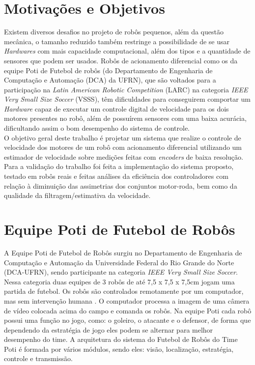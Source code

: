 \section{Motivações e Objetivos}
Existem diversos desafios no projeto de robôs pequenos, além da questão mecânica, o tamanho reduzido também restringe a possibilidade de se usar \emph{Hardwares} com mais capacidade computacional, além dos tipos e a quantidade de sensores que podem ser usados. Robôs de acionamento diferencial como os da equipe Poti de Futebol de robôs (do Departamento de Engenharia de Computação e Automação (DCA) da UFRN), que são voltados para a participação na \emph{Latin American Robotic Competition} (LARC) na categoria \emph{IEEE Very Small Size Soccer} (VSSS), têm dificuldades para conseguirem comportar um \emph{Hardware} capaz de executar um controle digital de velocidade para os dois motores presentes no robô, além de possuírem sensores com uma baixa acurácia, dificultando assim o bom desempenho do sistema de controle.\\

O objetivo geral deste trabalho é projetar um sistema que realize o controle de velocidade dos motores de um robô com acionamento diferencial utilizando um estimador de velocidade sobre medições feitas com \emph{encoders} de baixa resolução. Para a validação do trabalho foi feita a implementação do sistema proposto, testado em robôs reais e feitas análises da eficiência dos controladores com relação à diminuição das assimetrias dos conjuntos motor-roda, bem como da qualidade da filtragem/estimativa da velocidade. %

\section{Equipe Poti de Futebol de Robôs}
\label{sec:Equipe_Poti}

A Equipe Poti de Futebol de Robôs surgiu no Departamento de Engenharia de Computação e Automação da Universidade Federal do Rio Grande do Norte (DCA-UFRN), sendo participante na categoria \emph{IEEE Very Small Size Soccer}.\\

Nessa categoria duas equipes de 3 robôs de até 7,5 x 7,5 x 7,5cm jogam uma partida de futebol. Os robôs são controlados remotamente por um computador, mas sem intervenção humana \cite{VSSS}. O computador processa a imagem de uma câmera de vídeo colocada acima do campo e comanda os robôs. Na equipe Poti cada robô possui uma função no jogo, como: o goleiro, o atacante e o defensor, de forma que dependendo da estratégia de jogo eles podem se alternar para melhor desempenho do time. A arquitetura do sistema do Futebol de Robôs do Time Poti é formada por vários módulos, sendo eles: visão, localização, estratégia, controle e transmissão.\\

